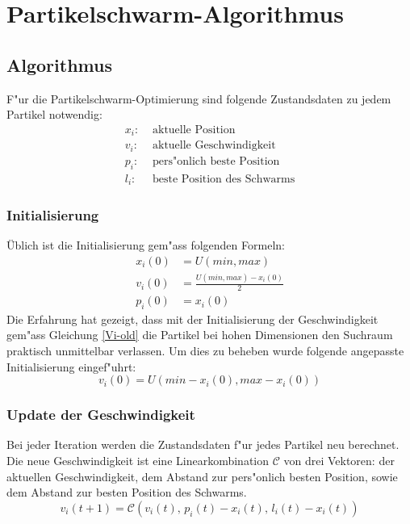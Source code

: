 \section{Partikelschwarm-Algorithmus}

\subsection{Algorithmus}
F"ur die Partikelschwarm-Optimierung sind folgende Zustandsdaten zu
jedem Partikel notwendig:
\begin{align*}
	x_i: & \text{ aktuelle Position}\\
	v_i: & \text{ aktuelle Geschwindigkeit}\\
	p_i: & \text{ pers"onlich beste Position} \\
	l_i: & \text{ beste Position des Schwarms}
\end{align*} 

\subsubsection{Initialisierung}
Üblich ist die Initialisierung gem"ass folgenden Formeln:
\begin{align}
	x_i(0) &= U(min,max) \\
	v_i(0) &= \frac{U(min,max) - x_i(0)}{2} \label{Vi-old} \\ 
	p_i(0) &= x_i(0)
\end{align}
Die Erfahrung hat gezeigt, dass mit der Initialisierung der
Geschwindigkeit gem"ass Gleichung \ref{Vi-old} die Partikel bei hohen
Dimensionen den Suchraum praktisch unmittelbar verlassen. Um dies zu
beheben wurde folgende angepasste Initialisierung eingef"uhrt:
\begin{equation}
	v_i(0) = U(min - x_i(0), max - x_i(0))
\end{equation}

\subsubsection{Update der Geschwindigkeit}
Bei jeder Iteration werden die Zustandsdaten f"ur jedes Partikel
neu berechnet. Die neue Geschwindigkeit ist eine Linearkombination
$\mathcal{C}$ von drei Vektoren: der aktuellen Geschwindigkeit, dem
Abstand zur pers"onlich besten Position, sowie dem Abstand zur besten
Position des Schwarms.
\begin{equation}
	v_{i}(t+1) = \mathcal{C}(v_i(t),\, p_i(t)-x_i(t),\, l_i(t)-x_i(t))
\end{equation}

